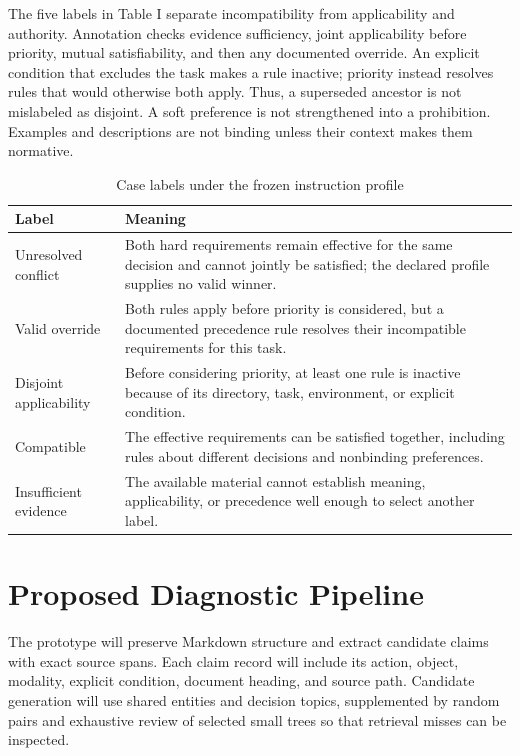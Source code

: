 \documentclass[10pt,conference]{IEEEtran}
\begin{document}
The five labels in Table I separate incompatibility from applicability and authority. Annotation checks evidence sufficiency, joint applicability before priority, mutual satisfiability, and then any documented override. An explicit condition that excludes the task makes a rule inactive; priority instead resolves rules that would otherwise both apply. Thus, a superseded ancestor is not mislabeled as disjoint. A soft preference is not strengthened into a prohibition. Examples and descriptions are not binding unless their context makes them normative.


\begin{table}[t]
\caption{Case labels under the frozen instruction profile}
\label{tab:labels}
\centering
\small
\begin{tabular}{>{\raggedright\arraybackslash}p{}>{\raggedright\arraybackslash}p{}}
\hline
\textbf{Label} & \textbf{Meaning}\\\hline
Unresolved conflict & Both hard requirements remain effective for the same decision and cannot jointly be satisfied; the declared profile supplies no valid winner.\\[3pt]
Valid override & Both rules apply before priority is considered, but a documented precedence rule resolves their incompatible requirements for this task.\\[3pt]
Disjoint applicability & Before considering priority, at least one rule is inactive because of its directory, task, environment, or explicit condition.\\[3pt]
Compatible & The effective requirements can be satisfied together, including rules about different decisions and nonbinding preferences.\\[3pt]
Insufficient evidence & The available material cannot establish meaning, applicability, or precedence well enough to select another label.\\[3pt]
\hline
\end{tabular}
\end{table}

\section{Proposed Diagnostic Pipeline}

The prototype will preserve Markdown structure and extract candidate claims with exact source spans. Each claim record will include its action, object, modality, explicit condition, document heading, and source path. Candidate generation will use shared entities and decision topics, supplemented by random pairs and exhaustive review of selected small trees so that retrieval misses can be inspected.
\end{document}
